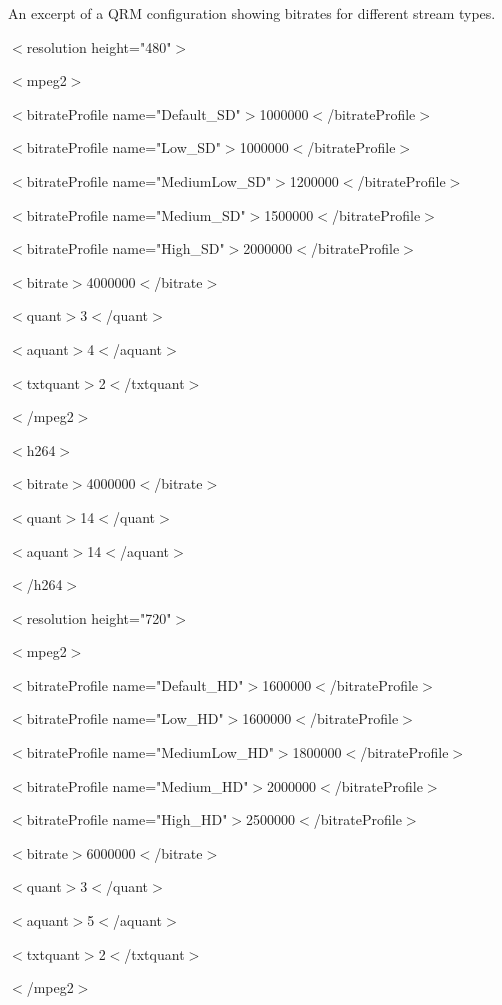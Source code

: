 \documentclass{article}
\begin{document}
An excerpt of a QRM configuration showing bitrates for different stream types.  
\newline
\newline

$<$resolution height="480"$>$

$<$mpeg2$>$

$<$bitrateProfile name="Default\_SD"$>$1000000$<$/bitrateProfile$>$

$<$bitrateProfile name="Low\_SD"$>$1000000$<$/bitrateProfile$>$

$<$bitrateProfile name="MediumLow\_SD"$>$1200000$<$/bitrateProfile$>$

$<$bitrateProfile name="Medium\_SD"$>$1500000$<$/bitrateProfile$>$

$<$bitrateProfile name="High\_SD"$>$2000000$<$/bitrateProfile$>$

$<$bitrate$>$4000000$<$/bitrate$>$

$<$quant$>$3$<$/quant$>$

$<$aquant$>$4$<$/aquant$>$

$<$txtquant$>$2$<$/txtquant$>$

$<$/mpeg2$>$

$<$h264$>$

$<$bitrate$>$4000000$<$/bitrate$>$

$<$quant$>$14$<$/quant$>$

$<$aquant$>$14$<$/aquant$>$

$<$/h264$>$
\newline
\newline

$<$resolution height="720"$>$

$<$mpeg2$>$

$<$bitrateProfile name="Default\_HD"$>$1600000$<$/bitrateProfile$>$

$<$bitrateProfile name="Low\_HD"$>$1600000$<$/bitrateProfile$>$

$<$bitrateProfile name="MediumLow\_HD"$>$1800000$<$/bitrateProfile$>$

$<$bitrateProfile name="Medium\_HD"$>$2000000$<$/bitrateProfile$>$

$<$bitrateProfile name="High\_HD"$>$2500000$<$/bitrateProfile$>$

$<$bitrate$>$6000000$<$/bitrate$>$

$<$quant$>$3$<$/quant$>$

$<$aquant$>$5$<$/aquant$>$

$<$txtquant$>$2$<$/txtquant$>$

$<$/mpeg2$>$
\end{document}
